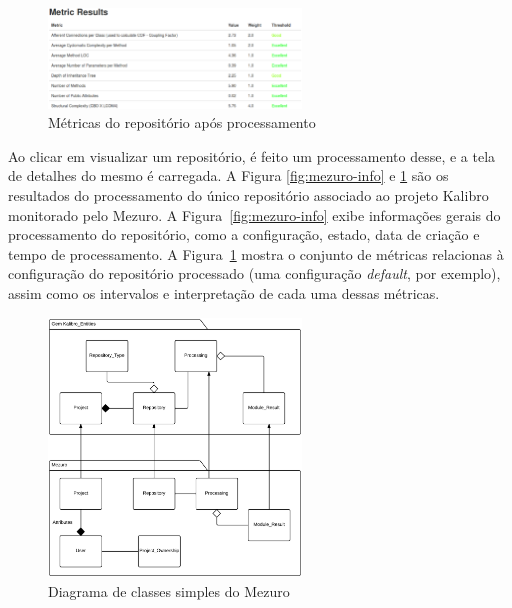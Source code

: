 \graphicspath{{figuras/}}
\begin{figure}[h]
\centering
\includegraphics[width=0.6\textwidth]{mezuro-result}
\caption{Métricas do repositório após processamento}
\label{fig:mezuro-result}
\end{figure}

Ao clicar em visualizar um repositório, é feito um processamento desse, e a tela de detalhes do mesmo é carregada. A Figura \ref{fig:mezuro-info} e \ref{fig:mezuro-result} são os resultados do processamento do único repositório associado ao projeto Kalibro monitorado pelo Mezuro.
%
A Figura~\ref{fig:mezuro-info} exibe informações gerais do processamento do repositório, como a configuração, estado, data de criação e tempo de processamento. A Figura~\ref{fig:mezuro-result} mostra o conjunto de métricas relacionas à configuração do repositório processado (uma configuração \textit{default}, por exemplo), assim como os intervalos e interpretação de cada uma dessas métricas.

\graphicspath{{figuras/}}
\begin{figure}[h]
\centering
\includegraphics[width=0.6\textwidth]{class-diagram-mezuro}
\caption{Diagrama de classes simples do Mezuro}
\label{class-diagram}
\end{figure}

